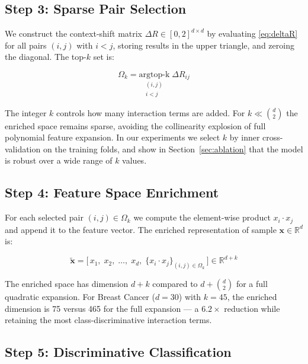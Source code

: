 \documentclass[conference]{IEEEtran}
\begin{document}
\subsection{Step 3: Sparse Pair Selection}

We construct the context-shift matrix $\Delta R \in [0,2]^{d \times d}$
by evaluating \eqref{eq:deltaR} for all pairs $(i, j)$ with $i < j$,
storing results in the upper triangle, and zeroing the diagonal.
The top-$k$ set is:

\begin{equation}
\Omega_k
= \underset{\substack{(i,j) \\ i < j}}{\mathrm{argtop\text{-}k}}\;
  \Delta R_{ij}
\label{eq:topk}
\end{equation}

The integer $k$ controls how many interaction terms are added.
For $k \ll \binom{d}{2}$ the enriched space remains sparse,
avoiding the collinearity explosion of full polynomial feature expansion.
In our experiments we select $k$ by inner cross-validation on the training
folds, and show in Section~\ref{sec:ablation} that the model is robust
over a wide range of $k$ values.

\subsection{Step 4: Feature Space Enrichment}

For each selected pair $(i, j) \in \Omega_k$ we compute the element-wise
product $x_i \cdot x_j$ and append it to the feature vector.
The enriched representation of sample $\mathbf{x} \in \mathbb{R}^d$ is:

\begin{equation}
\tilde{\mathbf{x}}
= \bigl[\,
    x_1,\; x_2,\; \ldots,\; x_d,\;
    \{x_i \cdot x_j\}_{(i,j) \in \Omega_k}
  \,\bigr]
\in \mathbb{R}^{d + k}
\label{eq:enriched}
\end{equation}

The enriched space has dimension $d + k$ compared to $d + \binom{d}{2}$
for a full quadratic expansion.
For Breast Cancer ($d = 30$) with $k = 45$, the enriched dimension is 75
versus 465 for the full expansion --- a $6.2\times$ reduction while
retaining the most class-discriminative interaction terms.

\subsection{Step 5: Discriminative Classification}
\end{document}
